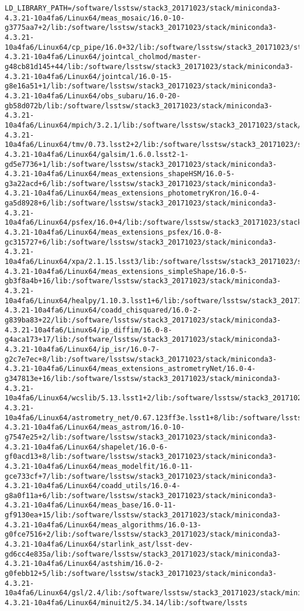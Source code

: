 \begin{verbatim}
LD_LIBRARY_PATH=/software/lsstsw/stack3_20171023/stack/miniconda3-4.3.21-10a4fa6/Linux64/meas_mosaic/16.0-10-g3775aa7+2/lib:/software/lsstsw/stack3_20171023/stack/miniconda3-4.3.21-10a4fa6/Linux64/cp_pipe/16.0+32/lib:/software/lsstsw/stack3_20171023/stack/miniconda3-4.3.21-10a4fa6/Linux64/jointcal_cholmod/master-g48cb81d145+44/lib:/software/lsstsw/stack3_20171023/stack/miniconda3-4.3.21-10a4fa6/Linux64/jointcal/16.0-15-g8e16a51+1/lib:/software/lsstsw/stack3_20171023/stack/miniconda3-4.3.21-10a4fa6/Linux64/obs_subaru/16.0-20-gb58d072b/lib:/software/lsstsw/stack3_20171023/stack/miniconda3-4.3.21-10a4fa6/Linux64/mpich/3.2.1/lib:/software/lsstsw/stack3_20171023/stack/miniconda3-4.3.21-10a4fa6/Linux64/tmv/0.73.lsst2+2/lib:/software/lsstsw/stack3_20171023/stack/miniconda3-4.3.21-10a4fa6/Linux64/galsim/1.6.0.lsst2-1-gd5e7736+1/lib:/software/lsstsw/stack3_20171023/stack/miniconda3-4.3.21-10a4fa6/Linux64/meas_extensions_shapeHSM/16.0-5-g3a22acd+6/lib:/software/lsstsw/stack3_20171023/stack/miniconda3-4.3.21-10a4fa6/Linux64/meas_extensions_photometryKron/16.0-4-ga5d8928+6/lib:/software/lsstsw/stack3_20171023/stack/miniconda3-4.3.21-10a4fa6/Linux64/psfex/16.0+4/lib:/software/lsstsw/stack3_20171023/stack/miniconda3-4.3.21-10a4fa6/Linux64/meas_extensions_psfex/16.0-8-gc315727+6/lib:/software/lsstsw/stack3_20171023/stack/miniconda3-4.3.21-10a4fa6/Linux64/xpa/2.1.15.lsst3/lib:/software/lsstsw/stack3_20171023/stack/miniconda3-4.3.21-10a4fa6/Linux64/meas_extensions_simpleShape/16.0-5-gb3f8a4b+16/lib:/software/lsstsw/stack3_20171023/stack/miniconda3-4.3.21-10a4fa6/Linux64/healpy/1.10.3.lsst1+6/lib:/software/lsstsw/stack3_20171023/stack/miniconda3-4.3.21-10a4fa6/Linux64/coadd_chisquared/16.0-2-g839ba83+22/lib:/software/lsstsw/stack3_20171023/stack/miniconda3-4.3.21-10a4fa6/Linux64/ip_diffim/16.0-8-g4aca173+17/lib:/software/lsstsw/stack3_20171023/stack/miniconda3-4.3.21-10a4fa6/Linux64/ip_isr/16.0-7-g2c7e7ec+8/lib:/software/lsstsw/stack3_20171023/stack/miniconda3-4.3.21-10a4fa6/Linux64/meas_extensions_astrometryNet/16.0-4-g347813e+16/lib:/software/lsstsw/stack3_20171023/stack/miniconda3-4.3.21-10a4fa6/Linux64/wcslib/5.13.lsst1+2/lib:/software/lsstsw/stack3_20171023/stack/miniconda3-4.3.21-10a4fa6/Linux64/astrometry_net/0.67.123ff3e.lsst1+8/lib:/software/lsstsw/stack3_20171023/stack/miniconda3-4.3.21-10a4fa6/Linux64/meas_astrom/16.0-10-g7547e25+2/lib:/software/lsstsw/stack3_20171023/stack/miniconda3-4.3.21-10a4fa6/Linux64/shapelet/16.0-6-gf0acd13+8/lib:/software/lsstsw/stack3_20171023/stack/miniconda3-4.3.21-10a4fa6/Linux64/meas_modelfit/16.0-11-gce733cf+7/lib:/software/lsstsw/stack3_20171023/stack/miniconda3-4.3.21-10a4fa6/Linux64/coadd_utils/16.0-4-g8a0f11a+6/lib:/software/lsstsw/stack3_20171023/stack/miniconda3-4.3.21-10a4fa6/Linux64/meas_base/16.0-11-gf9130ea+15/lib:/software/lsstsw/stack3_20171023/stack/miniconda3-4.3.21-10a4fa6/Linux64/meas_algorithms/16.0-13-g0fce7516+2/lib:/software/lsstsw/stack3_20171023/stack/miniconda3-4.3.21-10a4fa6/Linux64/starlink_ast/lsst-dev-gd6cc4e835a/lib:/software/lsstsw/stack3_20171023/stack/miniconda3-4.3.21-10a4fa6/Linux64/astshim/16.0-2-g0febb12+5/lib:/software/lsstsw/stack3_20171023/stack/miniconda3-4.3.21-10a4fa6/Linux64/gsl/2.4/lib:/software/lsstsw/stack3_20171023/stack/miniconda3-4.3.21-10a4fa6/Linux64/minuit2/5.34.14/lib:/software/lssts
\end{verbatim}

